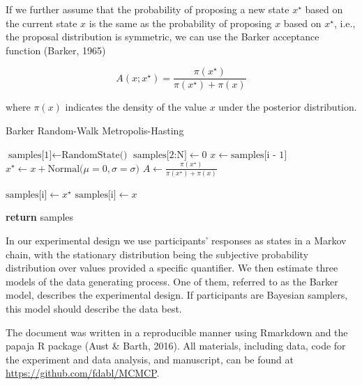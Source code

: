 \documentclass[english,floatsintext,man]{apa6}
\begin{document}
If we further assume that the probability of proposing a new state
\(x^{\star}\) based on the current state \(x\) is the same as the
probability of proposing \(x\) based on \(x^{\star}\), i.e., the
proposal distribution is symmetric, we can use the Barker acceptance
function (Barker, 1965)

\[
A(x; x^{\star}) = \frac{\pi(x^{\star})}{\pi(x^{\star}) + \pi(x)}
\]

where \(\pi(x)\) indicates the density of the value \(x\) under the
posterior distribution.

\begin{spacing}{0.8}
\begin{algorithm}[ht]
    \caption{Barker Random-Walk Metropolis-Hasting}
    
    \begin{algorithmic}
    
          \State $\mbox{samples[1]} \gets \mbox{RandomState()}$
          \State $\mbox{samples[2:N]} \gets 0$
              \State $x \gets \mbox{samples[i - 1]}$
              \State $x^{\star} \gets x + \mbox{Normal(}\mu = 0, \sigma = \sigma\mbox{)}$
              \State $A \gets \frac{\pi(x^{\star})}{\pi(x^{\star}) + \pi(x)}$
              
                  \State $\mbox{samples[i]} \gets x^{\star}$
              \Else
                  \State $\mbox{samples[i]} \gets x$
              \EndIf
              
          \EndFor
          
      \State \textbf{return} samples
      
      \EndProcedure
    \end{algorithmic}
\end{algorithm}
\end{spacing}

In our experimental design we use participants' responses as states in a
Markov chain, with the stationary distribution being the subjective
probability distribution over values provided a specific quantifier. We
then estimate three models of the data generating process. One of them,
referred to as the Barker model, describes the experimental design. If
participants are Bayesian samplers, this model should describe the data
best.

The document was written in a reproducible manner using Rmarkdown and
the papaja R package (Aust \& Barth, 2016). All materials, including
data, code for the experiment and data analysis, and manuscript, can be
found at
\mbox{\href{https://github.com/fdabl/MCMCP}{https://github.com/fdabl/MCMCP}}.
\end{document}
